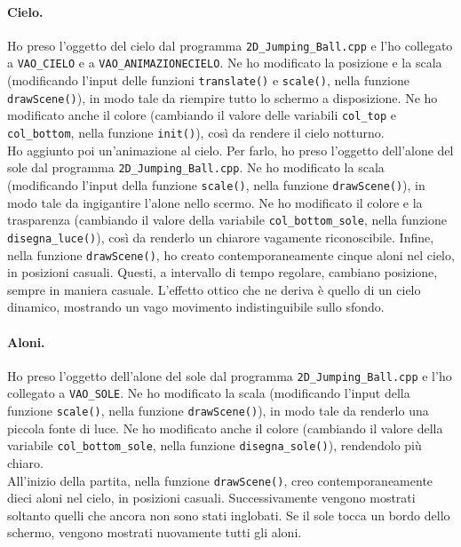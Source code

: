 \documentclass[a4paper, 12pt]{article}
\begin{document}
\paragraph{Cielo.}
Ho preso l'oggetto del cielo dal programma \texttt{2D\_Jumping\_Ball.cpp} e l'ho collegato a \texttt{VAO\_CIELO} e a \texttt{VAO\_ANIMAZIONECIELO}. Ne ho modificato la posizione e la scala (modificando l'input delle funzioni \texttt{translate()} e \texttt{scale()}, nella funzione \texttt{drawScene()}), in modo tale da riempire tutto lo schermo a disposizione. Ne ho modificato anche il colore (cambiando il valore delle variabili \texttt{col\_top} e \texttt{col\_bottom}, nella funzione \texttt{init()}), così da rendere il cielo notturno.\\
Ho aggiunto poi un'animazione al cielo. Per farlo, ho preso l'oggetto dell'alone del sole dal programma \texttt{2D\_Jumping\_Ball.cpp}. Ne ho modificato la scala (modificando l'input della funzione \texttt{scale()}, nella funzione \texttt{drawScene()}), in modo tale da ingigantire l'alone nello scermo. Ne ho modificato il colore e la trasparenza (cambiando il valore della variabile \texttt{col\_bottom\_sole}, nella funzione \texttt{disegna\_luce()}), così da renderlo un chiarore vagamente riconoscibile. Infine, nella funzione \texttt{drawScene()}, ho creato contemporaneamente cinque aloni nel cielo, in posizioni casuali. Questi, a intervallo di tempo regolare, cambiano posizione, sempre in maniera casuale. L'effetto ottico che ne deriva è quello di un cielo dinamico, mostrando un vago movimento indistinguibile sullo sfondo.

\paragraph{Aloni.}
Ho preso l'oggetto dell'alone del sole dal programma \texttt{2D\_Jumping\allowbreak\_Ball.cpp} e l'ho collegato a \texttt{VAO\_SOLE}. Ne ho modificato la scala (modificando l'input della funzione \texttt{scale()}, nella funzione \texttt{drawScene()}), in modo tale da renderlo una piccola fonte di luce. Ne ho modificato anche il colore (cambiando il valore della variabile \texttt{col\_bottom\_sole}, nella funzione \texttt{disegna\_sole()}), rendendolo più chiaro.\\
All'inizio della partita, nella funzione \texttt{drawScene()}, creo contemporaneamente dieci aloni nel cielo, in posizioni casuali. Successivamente vengono mostrati soltanto quelli che ancora non sono stati inglobati. Se il sole tocca un bordo dello schermo, vengono mostrati nuovamente tutti gli aloni.
\end{document}
